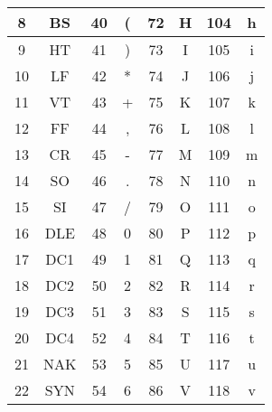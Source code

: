 \begin{table}[h!]
\begin{tabular}{|c|c|c|c|c|c|c|c|}
		8            & BS            & 40           & (             & 72           & H              & 104          & h               \\  \hline
		9            & HT            & 41           & )             & 73           & I              & 105          & i               \\  \hline
		10           & LF            & 42           & *             & 74           & J              & 106          & j               \\  \hline
		11           & VT            & 43           & +             & 75           & K              & 107          & k               \\  \hline
		12           & FF            & 44           & ,             & 76           & L              & 108          & l               \\  \hline
		13           & CR            & 45           & -             & 77           & M              & 109          & m               \\  \hline
		14           & SO            & 46           & .             & 78           & N              & 110          & n               \\  \hline
		15           & SI            & 47           & /             & 79           & O              & 111          & o               \\  \hline
		16           & DLE           & 48           & 0             & 80           & P              & 112          & p               \\  \hline
		17           & DC1           & 49           & 1             & 81           & Q              & 113          & q               \\  \hline
		18           & DC2           & 50           & 2             & 82           & R              & 114          & r               \\  \hline
		19           & DC3           & 51           & 3             & 83           & S              & 115          & s               \\  \hline
		20           & DC4           & 52           & 4             & 84           & T              & 116          & t               \\  \hline
		21           & NAK           & 53           & 5             & 85           & U              & 117          & u               \\  \hline
		22           & SYN           & 54           & 6             & 86           & V              & 118          & v               \\  \hline

\end{tabular}
\end{table}
